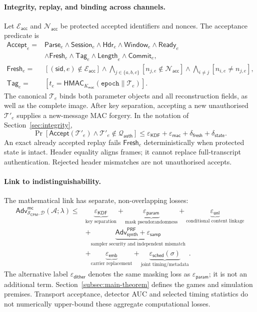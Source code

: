 \documentclass[pdflatex,sn-mathphys-num]{sn-jnl}%
\theoremstyle{definition}
\theoremstyle{game}
\theoremstyle{thmstyleone}%
\theoremstyle{thmstyletwo}%
\theoremstyle{thmstylethree}%
\begin{document}
\paragraph{Integrity, replay, and binding across channels.}
Let $\mathcal E_{\mathsf{acc}}$ and $\mathcal N_{\mathsf{acc}}$ be protected
accepted identifiers and nonces. The acceptance predicate is
\[
\begin{aligned}
\mathsf{Accept}_e={}&\mathsf{Parse}_e\wedge\mathsf{Session}_e\wedge\mathsf{Hdr}_e
\wedge\mathsf{Window}_e\wedge\mathsf{Ready}_e\\
&\wedge\mathsf{Fresh}_e\wedge\mathsf{Tag}_e\wedge\mathsf{Length}_e\wedge\mathsf{Commit}_e,\\
\mathsf{Fresh}_e={}&[(\mathsf{sid},e)\notin\mathcal E_{\mathsf{acc}}]
\wedge\bigwedge_{j\in\{a,b,c\}}[n_{j,e}\notin\mathcal N_{\mathsf{acc}}]\wedge\bigwedge_{i\ne j}[n_{i,e}\ne n_{j,e}],\\
\mathsf{Tag}_e={}&\left[t_e=
\mathsf{HMAC}_{K_{\mathsf{mac}}}(\texttt{epoch}\parallel\mathcal T_e)\right].
\end{aligned}
\]
The canonical $\mathcal T_e$ binds both parameter objects and all
reconstruction fields, as well as the complete image. After key separation,
accepting a new unauthorised $\mathcal T'_e$ supplies a new-message MAC
forgery. In the notation of Section~\ref{sec:integrity},
\[
\Pr[\mathsf{Accept}(\mathcal T'_e)\wedge\mathcal T'_e\notin\mathcal Q_{\mathsf{auth}}]
\le\varepsilon_{\mathsf{KDF}}+\varepsilon_{\mathsf{mac}}
+\delta_{\mathsf{fresh}}+\delta_{\mathsf{state}}.
\]
An exact already accepted replay fails $\mathsf{Fresh}_e$ deterministically
when protected state is intact. Header equality aligns frames; it cannot
replace full-transcript authentication. Rejected header mismatches are
not unauthorised accepts.

\paragraph{Link to indistinguishability.}
The mathematical link has separate, non-overlapping losses:
\[
\begin{aligned}
\mathsf{Adv}^{\mathsf{mc}}_{\mathcal S_{\mathsf{CPM}},\mathbf{\mathcal D}}(\mathcal A;\lambda)
\le{}&\underbrace{\varepsilon_{\mathsf{KDF}}}_{\text{key separation}}+
\underbrace{\varepsilon_{\mathsf{param}}}_{\text{mask pseudorandomness}}+
\underbrace{\varepsilon_{\mathsf{unl}}}_{\text{conditional content linkage}}\\
&+\underbrace{\mathsf{Adv}^{\mathsf{PRF}}_{\mathsf{synth}}+\varepsilon_{\mathsf{samp}}}_{\text{sampler security and independent mismatch}}\\
&+\underbrace{\varepsilon_{\mathsf{emb}}}_{\text{carrier replacement}}+
\underbrace{\varepsilon_{\mathsf{sched}}(\sigma)}_{\text{joint timing/metadata}}.
\end{aligned}
\]
The alternative label $\varepsilon_{\mathsf{dither}}$ denotes the same masking
loss as $\varepsilon_{\mathsf{param}}$; it is not an additional term.
Section~\ref{subsec:main-theorem} defines the games and simulation premises.
Transport acceptance, detector AUC and selected timing statistics do not
numerically upper-bound these aggregate computational losses.
\end{document}
